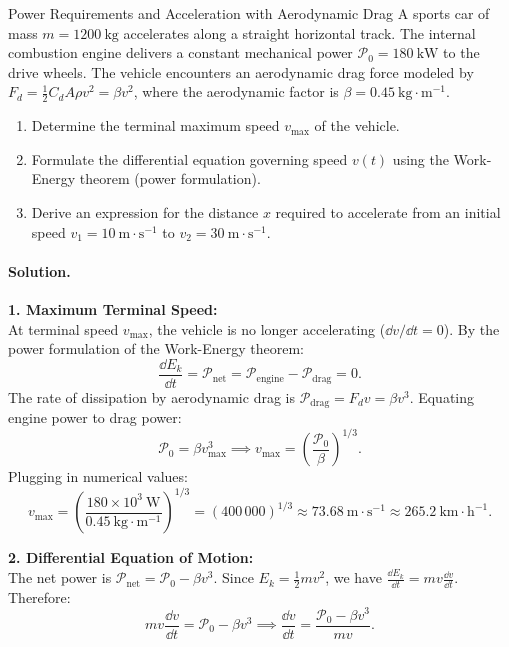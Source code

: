 \begin{workedexample}{Power Requirements and Acceleration with Aerodynamic Drag}
A sports car of mass $m = 1200\ \mathrm{kg}$ accelerates along a straight horizontal track. The internal combustion engine delivers a constant mechanical power $\mathcal{P}_0 = 180\ \mathrm{kW}$ to the drive wheels. The vehicle encounters an aerodynamic drag force modeled by $F_d = \frac{1}{2} C_d A \rho v^2 = \beta v^2$, where the aerodynamic factor is $\beta = 0.45\ \mathrm{kg\cdot m^{-1}}$.
\begin{enumerate}[leftmargin=1.4em,itemsep=3pt]
  \item Determine the terminal maximum speed $v_{\max}$ of the vehicle.
  \item Formulate the differential equation governing speed $v(t)$ using the Work-Energy theorem (power formulation).
  \item Derive an expression for the distance $x$ required to accelerate from an initial speed $v_1 = 10\ \mathrm{m\cdot s^{-1}}$ to $v_2 = 30\ \mathrm{m\cdot s^{-1}}$.
\end{enumerate}

\paragraph{Solution.}
\textbf{1. Maximum Terminal Speed:}\\
At terminal speed $v_{\max}$, the vehicle is no longer accelerating ($\dd v/\dd t = 0$). By the power formulation of the Work-Energy theorem:
\[
\frac{\dd E_k}{\dd t} = \mathcal{P}_{\text{net}} = \mathcal{P}_{\text{engine}} - \mathcal{P}_{\text{drag}} = 0.
\]
The rate of dissipation by aerodynamic drag is $\mathcal{P}_{\text{drag}} = F_d v = \beta v^3$. Equating engine power to drag power:
\[
\mathcal{P}_0 = \beta v_{\max}^3 \implies v_{\max} = \left(\frac{\mathcal{P}_0}{\beta}\right)^{1/3}.
\]
Plugging in numerical values:
\[
v_{\max} = \left( \frac{180 \times 10^3\ \mathrm{W}}{0.45\ \mathrm{kg\cdot m^{-1}}} \right)^{1/3} = (400\,000)^{1/3} \approx 73.68\ \mathrm{m\cdot s^{-1}} \approx 265.2\ \mathrm{km\cdot h^{-1}}.
\]

\textbf{2. Differential Equation of Motion:}\\
The net power is $\mathcal{P}_{\text{net}} = \mathcal{P}_0 - \beta v^3$. Since $E_k = \frac{1}{2}mv^2$, we have $\frac{\dd E_k}{\dd t} = mv\frac{\dd v}{\dd t}$. Therefore:
\[
mv \frac{\dd v}{\dd t} = \mathcal{P}_0 - \beta v^3 \implies \frac{\dd v}{\dd t} = \frac{\mathcal{P}_0 - \beta v^3}{mv}.
\]


\end{workedexample}
